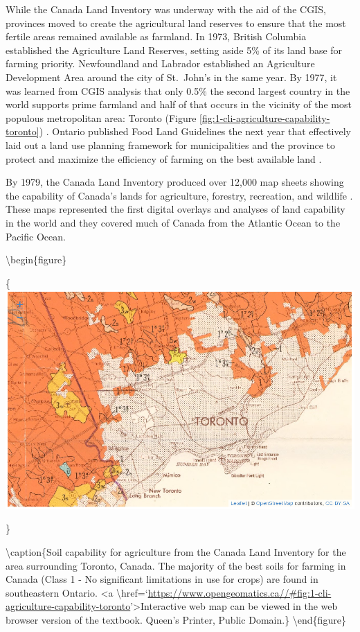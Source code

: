 \documentclass[
]{book}
\begin{document}
While the Canada Land Inventory was underway with the aid of the CGIS, provinces moved to create the agricultural land reserves to ensure that the most fertile areas remained available as farmland. In 1973, British Columbia established the Agriculture Land Reserves, setting aside 5\% of its land base for farming priority. Newfoundland and Labrador established an Agriculture Development Area around the city of St.~John's in the same year. By 1977, it was learned from CGIS analysis that only 0.5\% the second largest country in the world supports prime farmland and half of that occurs in the vicinity of the most populous metropolitan area: Toronto (Figure \ref{fig:1-cli-agriculture-capability-toronto}) \citep{manning_overview_1977}. Ontario published Food Land Guidelines the next year that effectively laid out a land use planning framework for municipalities and the province to protect and maximize the efficiency of farming on the best available land \citep{ministry_of_agriculture_and_food_food_1978}.

By 1979, the Canada Land Inventory produced over 12,000 map sheets showing the capability of Canada's lands for agriculture, forestry, recreation, and wildlife \citep{fisher_overview_1979}. These maps represented the first digital overlays and analyses of land capability in the world and they covered much of Canada from the Atlantic Ocean to the Pacific Ocean.

\textbackslash begin\{figure\}

\{\centering \includegraphics[width=0.75\linewidth]{images/01-cli-agriculture-capability-toronto}

\}

\textbackslash caption\{Soil capability for agriculture from the Canada Land Inventory for the area surrounding Toronto, Canada. The majority of the best soils for farming in Canada (Class 1 - No significant limitations in use for crops) are found in southeastern Ontario. \textless a
\textbackslash href=`\url{https://www.opengeomatics.ca//\#fig:1-cli-agriculture-capability-toronto}'\textgreater Interactive web map can be viewed in the web browser version of the textbook. Queen's Printer, Public Domain.\}\label{fig:1-cli-agriculture-capability-toronto}
\textbackslash end\{figure\}
\end{document}
